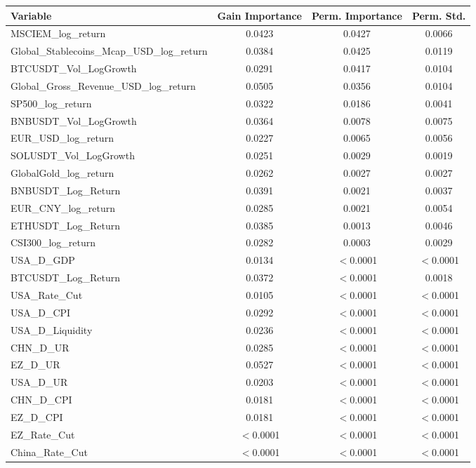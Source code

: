 \begin{tabular}{lccc}
  \toprule
  \textbf{Variable} & \textbf{Gain Importance} & \textbf{Perm. Importance} & \textbf{Perm. Std.} \\ 
  \midrule
  MSCIEM\_log\_return & 0.0423 & 0.0427 & 0.0066 \\ 
  Global\_Stablecoins\_Mcap\_USD\_log\_return & 0.0384 & 0.0425 & 0.0119 \\ 
  BTCUSDT\_Vol\_LogGrowth & 0.0291 & 0.0417 & 0.0104 \\ 
  Global\_Gross\_Revenue\_USD\_log\_return & 0.0505 & 0.0356 & 0.0104 \\ 
  SP500\_log\_return & 0.0322 & 0.0186 & 0.0041 \\ 
  BNBUSDT\_Vol\_LogGrowth & 0.0364 & 0.0078 & 0.0075 \\ 
  EUR\_USD\_log\_return & 0.0227 & 0.0065 & 0.0056 \\ 
  SOLUSDT\_Vol\_LogGrowth & 0.0251 & 0.0029 & 0.0019 \\ 
  GlobalGold\_log\_return & 0.0262 & 0.0027 & 0.0027 \\ 
  BNBUSDT\_Log\_Return & 0.0391 & 0.0021 & 0.0037 \\ 
  EUR\_CNY\_log\_return & 0.0285 & 0.0021 & 0.0054 \\ 
  ETHUSDT\_Log\_Return & 0.0385 & 0.0013 & 0.0046 \\ 
  CSI300\_log\_return & 0.0282 & 0.0003 & 0.0029 \\ 
  USA\_D\_GDP & 0.0134 & $<$0.0001 & $<$0.0001 \\ 
  BTCUSDT\_Log\_Return & 0.0372 & $<$0.0001 & 0.0018 \\ 
  USA\_Rate\_Cut & 0.0105 & $<$0.0001 & $<$0.0001 \\ 
  USA\_D\_CPI & 0.0292 & $<$0.0001 & $<$0.0001 \\ 
  USA\_D\_Liquidity & 0.0236 & $<$0.0001 & $<$0.0001 \\ 
  CHN\_D\_UR & 0.0285 & $<$0.0001 & $<$0.0001 \\ 
  EZ\_D\_UR & 0.0527 & $<$0.0001 & $<$0.0001 \\ 
  USA\_D\_UR & 0.0203 & $<$0.0001 & $<$0.0001 \\ 
  CHN\_D\_CPI & 0.0181 & $<$0.0001 & $<$0.0001 \\ 
  EZ\_D\_CPI & 0.0181 & $<$0.0001 & $<$0.0001 \\ 
  EZ\_Rate\_Cut & $<$0.0001 & $<$0.0001 & $<$0.0001 \\ 
  China\_Rate\_Cut & $<$0.0001 & $<$0.0001 & $<$0.0001 \\ 

\end{tabular}
